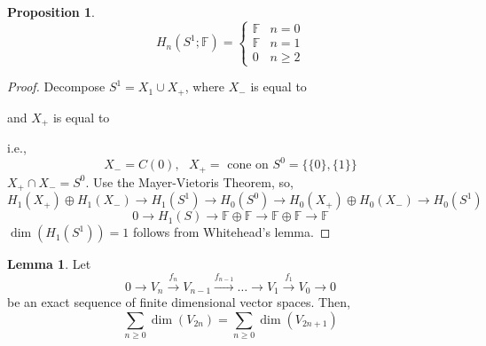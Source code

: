 \documentclass[a4paper,14pt]{extarticle}
\theoremstyle{definition}
\newtheorem*{lemma}{Lemma}
\newtheorem*{proposition}{Proposition}
\begin{document}
\begin{proposition}
	\[H_n(S^1;\mathbb{F})=\begin{cases}
		\mathbb{F} & n=0 \\ \mathbb{F} & n=1 \\ 0 & n\geq 2
	\end{cases}\]
\end{proposition}

\begin{proof}
	Decompose $S^1=X_1\cup X_+$, where
	$X_-$ is equal to
	\begin{center}
		\end{center}
	and $X_+$ is equal to
	\begin{center}
		\end{center}
	i.e., \[X_-=C(0),\text{ $X_+=$ cone on $S^0=\{\{0\},\{1\}\}$}\]
	$X_+\cap X_-=S^0$. Use the Mayer-Vietoris Theorem, so,
	\[H_1(X_+)\oplus H_1(X_-)\rightarrow H_1(S^1)\rightarrow H_0(S^0)
	\rightarrow H_0(X_+)\oplus H_0(X_-)\rightarrow H_0(S^1)\]
	\[0\rightarrow H_1(S)\rightarrow \mathbb{F}\oplus\mathbb{F}
	\rightarrow \mathbb{F}\oplus\mathbb{F}\rightarrow \mathbb{F}\]
	$\dim(H_1(S^1))=1$ follows from Whitehead's lemma.
\end{proof}

\begin{lemma}
	Let \[0\rightarrow V_n\xrightarrow{f_n} V_{n-1}\xrightarrow{f_{n-1}}
	\ldots\rightarrow
	V_1\xrightarrow{f_1} V_0\rightarrow 0\] be an exact sequence of finite
	dimensional vector spaces. Then,
	\[\sum_{n\geq0}\dim(V_{2n})=\sum_{n\geq0}\dim(V_{2n+1})\]
\end{lemma}
\end{document}
